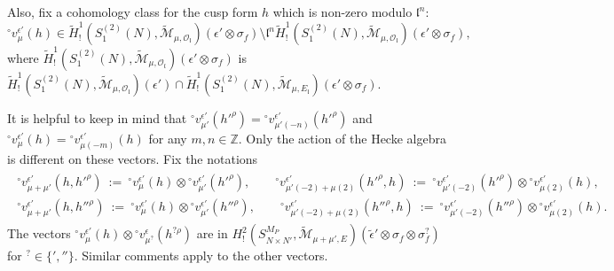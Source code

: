 \documentclass[11pt]{amsart}
\begin{document}
Also, fix a cohomology class for the cusp form $h$ which is non-zero modulo $\mathfrak{l}^n$:
\begin{equation}
	{^\circ}v^{\epsilon'}_{\mu}(h) \in \tilde{H}^1_!(S_1^{(2)}(N), \widetilde{\mathcal{M}}_{\mu,\mathcal{O}_\mathfrak{l}})(\epsilon' \otimes \sigma_f) 
	\setminus \mathfrak{l}^n\tilde{H}^1_!(S_1^{(2)}(N), \widetilde{\mathcal{M}}_{\mu,\mathcal{O}_\mathfrak{l}})(\epsilon' \otimes \sigma_f),
\end{equation}
where $\tilde{H}^1_!(S_1^{(2)}(N), \widetilde{\mathcal{M}}_{\mu,\mathcal{O}_\mathfrak{l}})(\epsilon' \otimes \sigma_f)$ is 
$\tilde{H}^1_!(S_1^{(2)}(N), \widetilde{\mathcal{M}}_{\mu,\mathcal{O}_\mathfrak{l}})(\epsilon')\cap 
\tilde{H}^1_!(S_1^{(2)}(N), \widetilde{\mathcal{M}}_{\mu,E_\mathfrak{l}})(\epsilon' \otimes \sigma_f).$ 

It is helpful to keep in mind that 
${^\circ}v^{\epsilon'}_{\mu'}(h'^\rho)= {^\circ}v^{\epsilon'}_{\mu'(-n)}(h'^\rho)$ and 
${^\circ}v^{\epsilon'}_{\mu}(h)= {^\circ}v^{\epsilon'}_{\mu(-m)}(h)$ for any $m,n\in \mathbb{Z}.$ Only the action of the Hecke algebra is different on these vectors.
Fix the notations
\begin{gather}
	\begin{split}
	{^\circ}v^{\epsilon'}_{\mu + \mu'}(h,h'^\rho) \ := \ {^\circ}v^{\epsilon'}_{\mu}(h) \otimes {^\circ}v^{\epsilon'}_{\mu'}(h'^\rho),\qquad
	{^\circ}v^{\epsilon'}_{\mu'(-2)+\mu(2)}(h'^\rho,h) \ := \ {^\circ}v^{\epsilon'}_{\mu'(-2)}(h'^\rho)\otimes {^\circ}v^{\epsilon'}_{\mu(2)}(h),\\
	{^\circ}v^{\epsilon'}_{\mu + \mu'}(h,h''^\rho) \ := \ {^\circ}v^{\epsilon'}_{\mu}(h) \otimes {^\circ}v^{\epsilon'}_{\mu'}(h''^\rho), \qquad
	{^\circ}v^{\epsilon'}_{\mu'(-2)+\mu(2)}(h''^\rho,h) \ := \ {^\circ}v^{\epsilon'}_{\mu'(-2)}(h''^\rho)\otimes {^\circ}v^{\epsilon'}_{\mu(2)}(h).
	\end{split}
\end{gather}
The vectors ${^\circ}v^{\epsilon'}_{\mu}(h) \otimes {^\circ}v_{\mu^?}^{\epsilon}(h^{?\rho})$  
are in 
$H^2_{!}(S_{N\times N'}^{M_P}, \widetilde{\mathcal{M}}_{\mu+\mu', E})(\tilde{\epsilon}'\otimes \sigma_f \otimes \sigma^?_f)$ for ${^?}\in \{ ', ''\}.$ 
Similar comments apply to the other vectors.
\end{document}
